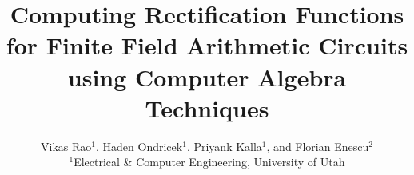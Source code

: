 \documentclass[]{acmart}
\begin{document}
\title{ Computing Rectification Functions for Finite Field Arithmetic Circuits using Computer Algebra Techniques} 
\author{Vikas Rao$^1$, Haden Ondricek$^1$, Priyank Kalla$^1$,  and Florian Enescu$^2$\\
$^1$Electrical \& Computer Engineering, University of Utah\\
}






\maketitle
\fancyfoot{} 	
\thispagestyle{empty}
\pagestyle{plain}


	






% 

% 
% 

\end{document}
